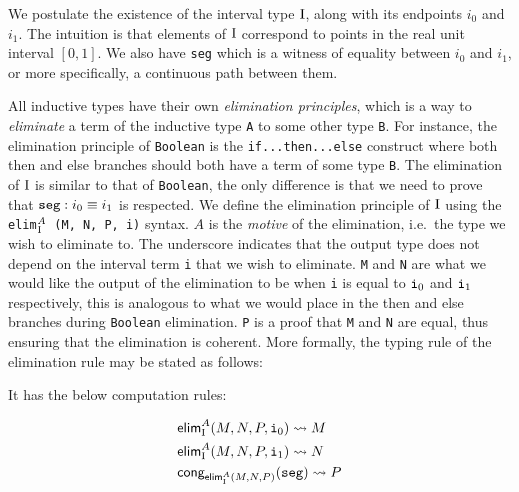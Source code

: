 \documentclass[12pt,twoside,maitrise]{dms}
\theoremstyle{definition}
\numberwithin{equation}{section}
\numberwithin{table}{chapter}
\numberwithin{figure}{chapter}
\newcommand\kw[1] {\textsf{#1}}
\newcommand\id[1] {\texttt{#1}}
\newcommand\fn[1] {\texttt{#1}}
\begin{document}
We postulate the existence of the interval type $\mathrm{I}$, along with its endpoints
\id{$i_0$} and \id{$i_1$}. The intuition is that elements of $\mathrm{I}$ correspond to
points in the real unit interval $[0, 1]$. We also have \id{seg} which is a
witness of equality between \id{$i_0$} and \id{$i_1$}, or more specifically, a
continuous path between them.

All inductive types have their own \emph{elimination principles}, which is a way
to \emph{eliminate} a term of the inductive type \id{A} to some other type
\id{B}. For instance, the elimination principle of \id{Boolean} is the
\fn{\kw{if}...\kw{then}...\kw{else}} construct where both \kw{then} and
\kw{else} branches should both have a term of some type \id{B}. The elimination
of $\mathrm{I}$ is similar to that of \id{Boolean}, the only difference is that we need
to prove that $\id{seg} : \eqtype{i_0}{i_1}$ is respected. We define the
elimination principle of $\mathrm{I}$ using the \fn{elim$_{\mathrm{I}}^{A}$ (M, N, P, i)}
syntax. $A$ is the \emph{motive} of the elimination, i.e.\ the type we wish to
eliminate to. The underscore indicates that the output type does not depend on
the interval term \id{i} that we wish to eliminate. \id{M} and \id{N} are what
we would like the output of the elimination to be when \id{i} is equal to
$\ileft$ and $\iright$ respectively, this is analogous to what we would place in
the \kw{then} and \kw{else} branches during \id{Boolean} elimination. \id{P} is
a proof that \id{M} and \id{N} are equal, thus ensuring that the elimination is
coherent. More formally, the typing rule of the elimination rule may be stated
as follows:

\begin{prooftree*}
   \infer3{\oftype{\ctx, \oftype{i}{\bI}}{\kw{elim}_{\bI}^{A} (M, N, P, i)}{A}}
\end{prooftree*}

It has the below computation rules:

\begin{align*}
  & \kw{elim}_{\bI}^{A}(M, N, P, \ileft) \rightsquigarrow{} M \\
  & \kw{elim}_{\bI}^{A}(M, N, P, \iright) \rightsquigarrow{} N \\
  & \kw{cong}_{\kw{elim}_{\bI}^{A}(M, N, P)}(\id{seg}) \rightsquigarrow{} P
\end{align*}
\end{document}
